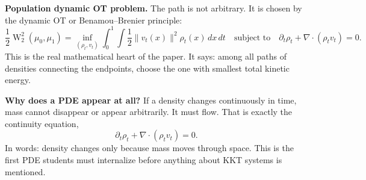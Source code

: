 \documentclass[11pt]{report}
\newcommand{\W}{\operatorname{W}}
\begin{document}
\textbf{Population dynamic OT problem.}
The path is not arbitrary.  It is chosen by the dynamic OT or Benamou--Brenier
principle:
\begin{equation}
\frac12\W_2^2(\mu_0,\mu_1)
=
\inf_{(\rho_t,v_t)}
\int_0^1 \int \frac12\|v_t(x)\|^2\rho_t(x)\,dx\,dt
\quad\text{subject to}\quad
\partial_t\rho_t + \nabla\cdot(\rho_t v_t)=0.
\label{eq:geonet-benamou-brenier}
\end{equation}
This is the real mathematical heart of the paper.  It says: among all paths of
densities connecting the endpoints, choose the one with smallest total kinetic
energy.

\textbf{Why does a PDE appear at all?}
If a density changes continuously in time, mass cannot disappear or appear
arbitrarily.  It must flow.  That is exactly the continuity equation,
\begin{equation}
\partial_t\rho_t + \nabla\cdot(\rho_t v_t)=0.
\label{eq:geonet-continuity-base}
\end{equation}
In words: density changes only because mass moves through space.  This is the first
PDE students must internalize before anything about KKT systems is mentioned.
\end{document}
